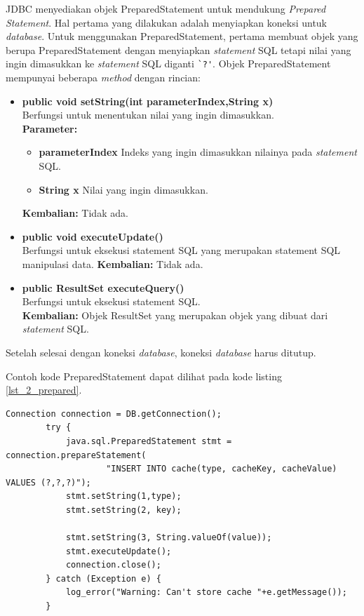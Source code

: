 JDBC menyediakan objek PreparedStatement untuk mendukung \textit{Prepared Statement}. Hal pertama yang dilakukan adalah menyiapkan koneksi untuk \textit{database}. Untuk menggunakan PreparedStatement, pertama membuat objek yang berupa PreparedStatement dengan menyiapkan \textit{statement} SQL tetapi nilai yang ingin dimasukkan ke \textit{statement} SQL diganti \verb!`?'!.
Objek PreparedStatement mempunyai beberapa \textit{method} dengan rincian: 
 \begin{itemize}
 	\item \textbf{public void setString(int parameterIndex,String x)}\\
 			Berfungsi untuk menentukan nilai yang ingin dimasukkan.\\
 			\textbf{Parameter:}
 			\begin{itemize}
 				\item \textbf{parameterIndex} Indeks yang ingin dimasukkan nilainya pada \textit{statement} SQL.
 				\item \textbf{String x} Nilai yang ingin dimasukkan.
 			\end{itemize}
 			\textbf{Kembalian:} Tidak ada.
 	\item \textbf{public void executeUpdate()}\\
 			Berfungsi untuk eksekusi statement SQL yang merupakan statement SQL manipulasi data.
 			\textbf{Kembalian:} Tidak ada.
 	\item \textbf{public ResultSet executeQuery()}\\
 			Berfungsi untuk eksekusi statement SQL.\\
 			\textbf{Kembalian:} Objek ResultSet yang merupakan objek yang dibuat dari \textit{statement} SQL.
\end{itemize}
Setelah selesai dengan koneksi \textit{database}, koneksi \textit{database} harus ditutup.
 
 Contoh kode PreparedStatement dapat dilihat pada kode listing \ref{lst_2_prepared}.

\begin{lstlisting}[caption=Contoh PreparedStatement,label = {lst_2_prepared}]
		Connection connection = DB.getConnection();
        try {
            java.sql.PreparedStatement stmt = connection.prepareStatement(
                    "INSERT INTO cache(type, cacheKey, cacheValue) VALUES (?,?,?)");
            stmt.setString(1,type);
            stmt.setString(2, key);

            stmt.setString(3, String.valueOf(value));
            stmt.executeUpdate();
            connection.close();
        } catch (Exception e) {
            log_error("Warning: Can't store cache "+e.getMessage());
        }
\end{lstlisting}

